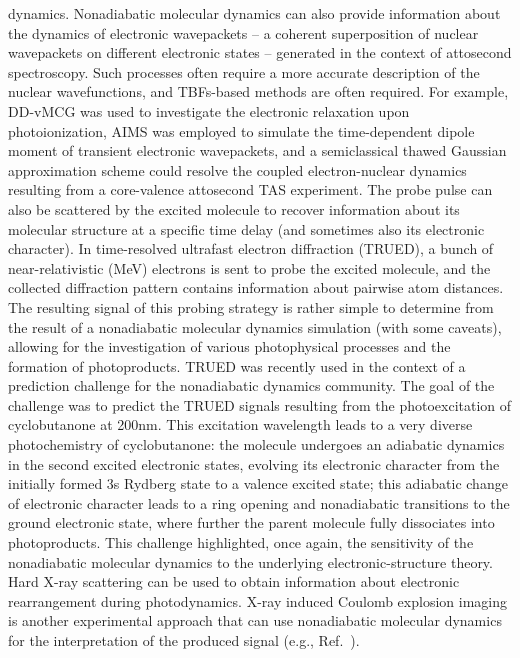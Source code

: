 \documentclass[9pt,bestpractices,pubversion]{livecoms}
\begin{document}
dynamics.\cite{schuurman2021ATAS} Nonadiabatic molecular dynamics can also provide information about the dynamics of electronic wavepackets -- a coherent superposition of nuclear wavepackets on different electronic states -- generated in the context of attosecond spectroscopy. Such processes often require a more accurate description of the nuclear wavefunctions, and TBFs-based methods are often required. For example, DD-vMCG was used to investigate the electronic relaxation upon photoionization,\cite{vacher2017electron} AIMS was employed to simulate the time-dependent dipole moment of transient electronic wavepackets,\cite{mignolet2018walk} and a semiclassical thawed Gaussian approximation scheme could resolve the coupled electron-nuclear dynamics resulting from a core-valence attosecond TAS experiment.\cite{golubevPRL2021}  The probe pulse can also be scattered by the excited molecule to recover information about its molecular structure at a specific time delay (and sometimes also its electronic character). In time-resolved ultrafast electron diffraction (TRUED), a bunch of near-relativistic (MeV) electrons is sent to probe the excited molecule, and the collected diffraction pattern contains information about pairwise atom distances. The resulting signal of this probing strategy is rather simple to determine from the result of a nonadiabatic molecular dynamics simulation (with some caveats), allowing for the investigation of various photophysical processes\cite{yang2018imaging,wolf2019photochemical,PhysRevLett.131.143001} and the formation of photoproducts.\cite{nunes2024ued} TRUED was recently used in the context of a prediction challenge for the nonadiabatic dynamics community.\cite{predictionchallenge} The goal of the challenge was to predict the TRUED signals resulting from the photoexcitation of cyclobutanone at 200nm. This excitation wavelength leads to a very diverse photochemistry of cyclobutanone: the molecule undergoes an adiabatic dynamics in the second excited electronic states, evolving its electronic character from the initially formed 3s Rydberg state to a valence excited state; this adiabatic change of electronic character leads to a ring opening and nonadiabatic transitions to the ground electronic state, where further the parent molecule fully dissociates into photoproducts. This challenge highlighted, once again, the sensitivity of the nonadiabatic molecular dynamics to the underlying electronic-structure theory. Hard X-ray scattering can be used to obtain information about electronic rearrangement during photodynamics.\cite{gabalski2025imaging}
X-ray induced Coulomb explosion imaging is another experimental approach that can use nonadiabatic molecular dynamics for the interpretation of the produced signal (e.g., Ref.~). 
\end{document}
